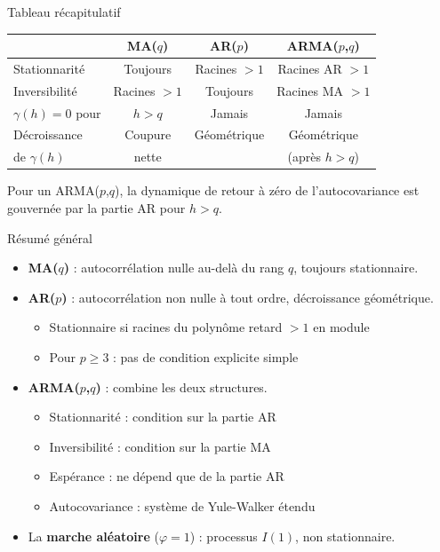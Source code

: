 \documentclass[11pt,aspectratio=169]{beamer}
\begin{document}
\begin{frame}{Tableau récapitulatif}
\begin{center}
\begin{tabular}{|l|c|c|c|}
\hline
& \textbf{MA($q$)} & \textbf{AR($p$)} & \textbf{ARMA($p$,$q$)} \\
\hline
Stationnarité & Toujours & Racines $> 1$ & Racines AR $> 1$ \\
\hline
Inversibilité & Racines $> 1$ & Toujours & Racines MA $> 1$ \\
\hline
$\gamma(h) = 0$ pour & $h > q$ & Jamais & Jamais \\
\hline
Décroissance & Coupure & Géométrique & Géométrique \\
de $\gamma(h)$ & nette & & (après $h > q$) \\
\hline
\end{tabular}
\end{center}



Pour un ARMA($p$,$q$), la dynamique de retour à zéro de l'autocovariance est gouvernée par la partie AR pour $h > q$.
\end{frame}

\begin{frame}{Résumé général}

\begin{itemize}

\item \textbf{MA($q$)} : autocorrélation nulle au-delà du rang $q$, toujours stationnaire.\newline

\item \textbf{AR($p$)} : autocorrélation non nulle à tout ordre, décroissance géométrique.
  \begin{itemize}
  \item Stationnaire si racines du polynôme retard $> 1$ en module\newline
  \item Pour $p \geq 3$ : pas de condition explicite simple
  \end{itemize}

\item \textbf{ARMA($p$,$q$)} : combine les deux structures.
  \begin{itemize}
  \item Stationnarité : condition sur la partie AR\newline
  \item Inversibilité : condition sur la partie MA\newline
  \item Espérance : ne dépend que de la partie AR\newline
  \item Autocovariance : système de Yule-Walker étendu
  \end{itemize}

\item La \textbf{marche aléatoire} ($\varphi = 1$) : processus $I(1)$, non stationnaire.

\end{itemize}

\end{frame}
\end{document}
